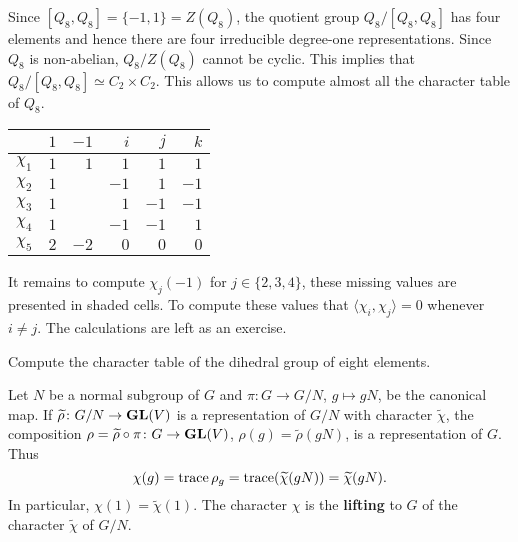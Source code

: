 \begin{example}
	Since $[Q_8,Q_8]=\{-1,1\}=Z(Q_8)$, the quotient group $Q_8/[Q_8,Q_8]$ has four elements and
	hence there are four irreducible degree-one representations. Since 
	$Q_8$ is non-abelian, $Q_8/Z(Q_8)$ cannot be cyclic. 
	This implies that 
	$Q_8/[Q_8,Q_8]\simeq C_2\times C_2$. This allows us
	to compute almost all the character table of $Q_8$. 
		\begin{center}
		\begin{tabular}{|c|rrrrr|}
			\hline
			& $1$ & $-1$ & $i$ & $j$ & $k$\tabularnewline
			\hline
			$\chi_1$ & $1$ & $1$ & $1$ & $1$ & $1$\tabularnewline
			$\chi_2$ & $1$ & \cellcolor{gray!30}{$1$} & $-1$ & $1$ & $-1$\tabularnewline
			$\chi_3$ & $1$ & \cellcolor{gray!30}{$1$} & $1$ & $-1$ & $-1$\tabularnewline
			$\chi_4$ & $1$ & \cellcolor{gray!30}{$1$} & $-1$ & $-1$ & $1$\tabularnewline
			$\chi_5$ & $2$ & $-2$ & $0$ & $0$ & $0$\tabularnewline
			\hline
		\end{tabular}
	\end{center}
	It remains to compute $\chi_j(-1)$ for $j\in\{2,3,4\}$, these missing values are presented in shaded
    cells. To compute these values that $\langle\chi_i,\chi_j\rangle=0$ whenever $i\ne j$. The calculations
    are left as an exercise. 



\end{example}

\begin{exercise}
    Compute the character table of the dihedral group of eight elements. 
\end{exercise}


Let $N$ be a normal subgroup of $G$ 
and $\pi\colon G\to G/N$, $g\mapsto gN$, be the canonical map. 
If $\widetilde{\rho}\colon G/N\to\mathbf{GL}(V)$ 
is a representation of $G/N$ with 
character
$\widetilde{\chi}$, the composition 
$\rho=\widetilde{\rho}\circ\pi\colon G\to \mathbf{GL}(V)$, $\rho(g)=\widetilde{\rho}(gN)$, 
is a representation of $G$. 
Thus
\[
\chi(g)=\operatorname{trace}{\rho_g}=\operatorname{trace}(\widetilde{\chi}(gN))=\widetilde{\chi}(gN).
\]
In particular, $\chi(1)=\widetilde{\chi}(1)$. The character $\chi$ 
is the \textbf{lifting} to $G$ of the character 
$\widetilde{\chi}$ of $G/N$. 

